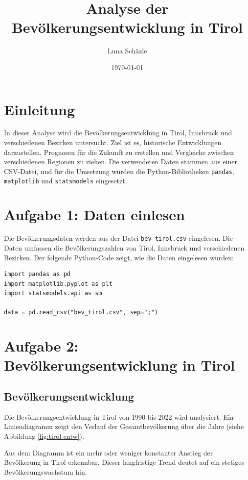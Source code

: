\documentclass[a4paper,12pt]{article}
\title{Analyse der Bevölkerungsentwicklung in Tirol}
\author{Luna Schäzle}
\date{\today}
\begin{document}
\maketitle

\tableofcontents
\newpage

\section{Einleitung}

In dieser Analyse wird die Bevölkerungsentwicklung in Tirol, Innsbruck und verschiedenen Bezirken untersucht. Ziel ist es, historische Entwicklungen darzustellen, Prognosen für die Zukunft zu erstellen und Vergleiche zwischen verschiedenen Regionen zu ziehen. Die verwendeten Daten stammen aus einer CSV-Datei, und für die Umsetzung wurden die Python-Bibliotheken \texttt{pandas}, \texttt{matplotlib} und \texttt{statsmodels} eingesetzt.

\section{Aufgabe 1: Daten einlesen}

Die Bevölkerungsdaten werden aus der Datei \texttt{bev\_tirol.csv} eingelesen. Die Daten umfassen die Bevölkerungszahlen von Tirol, Innsbruck und verschiedenen Bezirken. Der folgende Python-Code zeigt, wie die Daten eingelesen wurden:

\begin{verbatim}
import pandas as pd
import matplotlib.pyplot as plt
import statsmodels.api as sm

data = pd.read_csv("bev_tirol.csv", sep=";")
\end{verbatim}

\section{Aufgabe 2: Bevölkerungsentwicklung in Tirol}

\subsection{Bevölkerungsentwicklung}

Die Bevölkerungsentwicklung in Tirol von 1990 bis 2022 wird analysiert. Ein Liniendiagramm zeigt den Verlauf der Gesamtbevölkerung über die Jahre (siehe Abbildung \ref{fig:tirol-entw}).

Aus dem Diagramm ist ein mehr oder weniger konstanter Anstieg der Bevölkerung in Tirol erkennbar. Dieser langfristige Trend deutet auf ein stetiges Bevölkerungswachstum hin.
\end{document}
